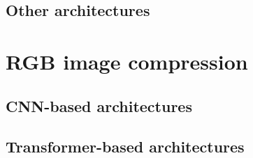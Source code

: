\subsection{Other architectures}
\section{RGB image compression \label{sec:ch2rgb}}
\subsection{CNN-based architectures}
\subsection{Transformer-based architectures}
